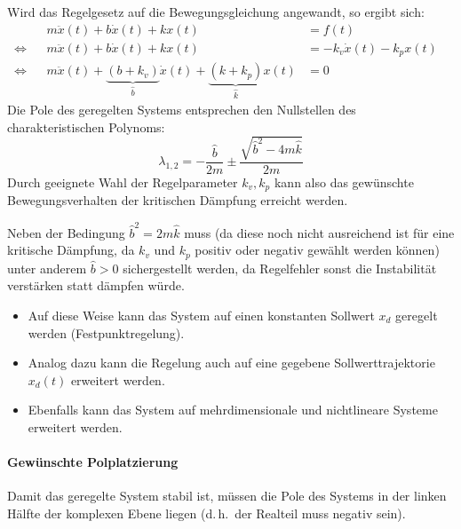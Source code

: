 \documentclass[a4paper, 11pt, accentcolor = tud3b]{tudreport}
\renewcommand{\dh}{d.\,h.~}
\begin{document}
					Wird das Regelgesetz auf die Bewegungsgleichung angewandt, so ergibt sich:
					\begin{align*}
						     &  & m\ddot{x}(t) + b\dot{x}(t) + kx(t)                                                                 & = f(t)                       &  \\
						\iff &  & m\ddot{x}(t) + b\dot{x}(t) + kx(t)                                                                 & = -k_v \dot{x}(t) - k_p x(t) &  \\
						\iff &  & m\ddot{x}(t) + \underbrace{(b + k_v)}_{\hat{b}} \dot{x}(t) + \underbrace{(k + k_p)}_{\hat{k}} x(t) & = 0                          &
					\end{align*}
					Die Pole des geregelten Systems entsprechen den Nullstellen des charakteristischen Polynoms:
					\begin{equation*}
						\lambda_{1, 2} = -\frac{\hat{b}}{2m} \pm \frac{\sqrt{\hat{b}^2 - 4m\hat{k}}}{2m}
					\end{equation*}
					Durch geeignete Wahl der Regelparameter \( k_v, k_p \) kann also das gewünschte Bewegungsverhalten der kritischen Dämpfung erreicht werden.
					
					Neben der Bedingung \( \hat{b}^2 = 2m\hat{k} \) muss (da diese noch nicht ausreichend ist für eine kritische Dämpfung, da \( k_v \) und \( k_p \) positiv oder negativ gewählt werden können) unter anderem \( \hat{b} > 0 \) sichergestellt werden, da Regelfehler sonst die Instabilität verstärken statt dämpfen würde.
					
					\begin{itemize}
						\item Auf diese Weise kann das System auf einen konstanten Sollwert \( x_d \) geregelt werden (Festpunktregelung).
						\item Analog dazu kann die Regelung auch auf eine gegebene Sollwerttrajektorie \( x_d(t) \) erweitert werden.
						\item Ebenfalls kann das System auf mehrdimensionale und nichtlineare Systeme erweitert werden.
					\end{itemize}
				
					\paragraph{Gewünschte Polplatzierung}
						Damit das geregelte System stabil ist, müssen die Pole des Systems in der linken Hälfte der komplexen Ebene liegen (\dh der Realteil muss negativ sein).
\end{document}
